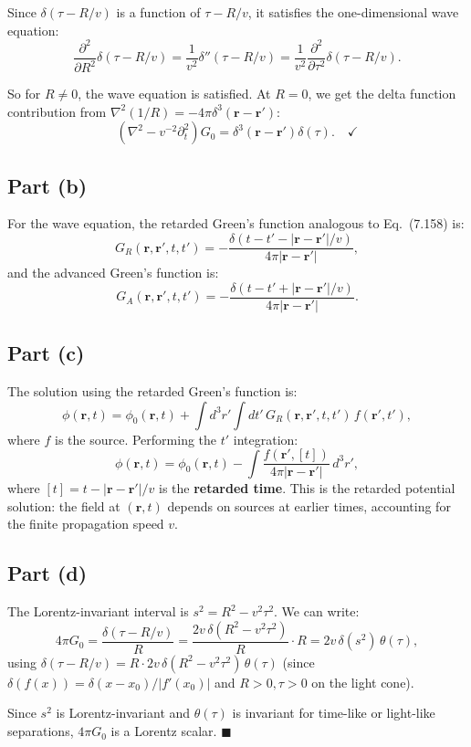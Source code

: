 \documentclass[12pt]{article}
\begin{document}
Since $\delta(\tau - R/v)$ is a function of $\tau - R/v$, it satisfies the one-dimensional wave equation:
\[
\frac{\partial^2}{\partial R^2}\delta(\tau-R/v) = \frac{1}{v^2}\delta''(\tau-R/v) = \frac{1}{v^2}\frac{\partial^2}{\partial\tau^2}\delta(\tau-R/v).
\]

So for $R \neq 0$, the wave equation is satisfied. At $R = 0$, we get the delta function contribution from $\nabla^2(1/R) = -4\pi\delta^3(\mathbf{r}-\mathbf{r}')$:
\[
(\nabla^2 - v^{-2}\partial_t^2)G_0 = \delta^3(\mathbf{r}-\mathbf{r}')\delta(\tau). \quad \checkmark
\]

\subsection*{Part (b)}

For the wave equation, the retarded Green's function analogous to Eq.\ (7.158) is:
\[
G_R(\mathbf{r},\mathbf{r}',t,t') = -\frac{\delta(t-t'-|\mathbf{r}-\mathbf{r}'|/v)}{4\pi|\mathbf{r}-\mathbf{r}'|},
\]
and the advanced Green's function is:
\[
G_A(\mathbf{r},\mathbf{r}',t,t') = -\frac{\delta(t-t'+|\mathbf{r}-\mathbf{r}'|/v)}{4\pi|\mathbf{r}-\mathbf{r}'|}.
\]

\subsection*{Part (c)}

The solution using the retarded Green's function is:
\[
\phi(\mathbf{r},t) = \phi_0(\mathbf{r},t) + \int d^3r'\int dt'\,G_R(\mathbf{r},\mathbf{r}',t,t')\,f(\mathbf{r}',t'),
\]
where $f$ is the source. Performing the $t'$ integration:
\[
\phi(\mathbf{r},t) = \phi_0(\mathbf{r},t) - \int\frac{f(\mathbf{r}',[t])}{4\pi|\mathbf{r}-\mathbf{r}'|}\,d^3r',
\]
where $[t] = t - |\mathbf{r}-\mathbf{r}'|/v$ is the \textbf{retarded time}. This is the retarded potential solution: the field at $(\mathbf{r},t)$ depends on sources at earlier times, accounting for the finite propagation speed $v$.

\subsection*{Part (d)}

The Lorentz-invariant interval is $s^2 = R^2 - v^2\tau^2$. We can write:
\[
4\pi G_0 = \frac{\delta(\tau - R/v)}{R} = \frac{2v\,\delta(R^2 - v^2\tau^2)}{R}\cdot R = 2v\,\delta(s^2)\,\theta(\tau),
\]
using $\delta(\tau - R/v) = R\cdot 2v\,\delta(R^2 - v^2\tau^2)\,\theta(\tau)$ (since $\delta(f(x)) = \delta(x-x_0)/|f'(x_0)|$ and $R>0, \tau>0$ on the light cone).

Since $s^2$ is Lorentz-invariant and $\theta(\tau)$ is invariant for time-like or light-like separations, $4\pi G_0$ is a Lorentz scalar. $\blacksquare$
\end{document}
